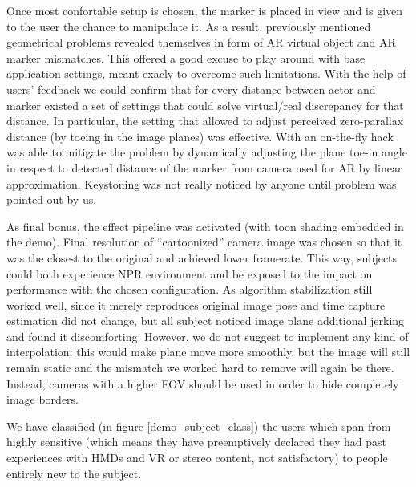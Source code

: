 Once most confortable setup is chosen, the marker is placed in view and is given to the user the chance to manipulate it. As a result, previously mentioned geometrical problems revealed themselves in form of AR virtual object and AR marker mismatches. This offered a good excuse to play around with base application settings, meant exacly to overcome such limitations. With the help of users' feedback we could confirm that for every distance between actor and marker existed a set of settings that could solve virtual/real discrepancy for that distance. In particular, the setting that allowed to adjust perceived zero-parallax distance (by toeing in the image planes) was effective. With an on-the-fly hack was able to mitigate the problem by dynamically adjusting the plane toe-in angle in respect to detected distance of the marker from camera used for AR by linear approximation. Keystoning was not really noticed by anyone until problem was pointed out by us.

As final bonus, the effect pipeline was activated (with toon shading embedded in the demo). Final resolution of “cartoonized” camera image was chosen so that it was the closest to the original and achieved lower framerate. This way, subjects could both experience NPR environment and be exposed to the impact on performance with the chosen configuration. As algorithm stabilization still worked well, since it merely reproduces original image pose and time capture estimation did not change, but all subject noticed image plane additional jerking and found it discomforting. However, we do not suggest to implement any kind of interpolation: this would make plane move more smoothly, but the image will still remain static and the mismatch we worked hard to remove will again be there. Instead, cameras with a higher FOV should be used in order to hide completely image borders.

We have classified (in figure \ref{demo_subject_class}) the users which span from highly sensitive (which means they have preemptively declared they had past experiences with HMDs and VR or stereo content, not satisfactory) to people entirely new to the subject.

